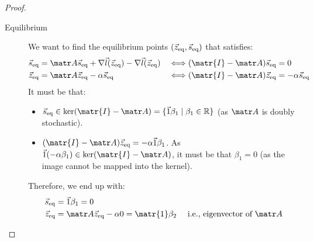 \begin{description}
\begin{theorem}
\begin{proof}

                \begin{description}
                    \item[Equilibrium]
                        We want to find the equilibrium points $({\vec{z}}_\text{eq}, {\vec{s}}_\text{eq})$ that satisfies:
                        \[
                            \begin{aligned}
                                \s_\text{eq} &= \A \s_\text{eq} + \nabla \vec{l}(\z_\text{eq}) - \nabla \vec{l}(\z_\text{eq}) &\iff& (\matr{I} - \A) \s_\text{eq} = 0 \\
                                \z_\text{eq} &= \A\z_\text{eq} - \alpha \s_\text{eq} &\iff& (\matr{I} - \A) \z_\text{eq} = -\alpha \s_\text{eq} \\
                            \end{aligned}
                        \]
                        It must be that:
                        \begin{itemize}
                            \item $\s_\text{eq} \in \text{ker}(\matr{I} - \A) = \{ \vec{1}\beta_1 \mid \beta_1 \in \R \}$ (as $\A$ is doubly stochastic).
                            \item $(\matr{I} - \A) \z_\text{eq} = - \alpha \vec{1} \beta_1$. As $\vec{1} (-\alpha \beta_1) \in \text{ker}(\matr{I} - \A)$, it must be that $\beta_1 = 0$ (as the image cannot be mapped into the kernel).
                        \end{itemize}
                        Therefore, we end up with:
                        \[
                            \begin{split}
                                \s_\text{eq} &= \vec{1}\beta_1 = 0 \\
                                \z_\text{eq} &= \A\z_\text{eq} - \alpha 0 = \matr{1} \beta_2 \quad \text{ i.e., eigenvector of $\A$} \\
                            \end{split}
                        \]


\end{description}
\end{proof}
\end{theorem}
\end{description}
